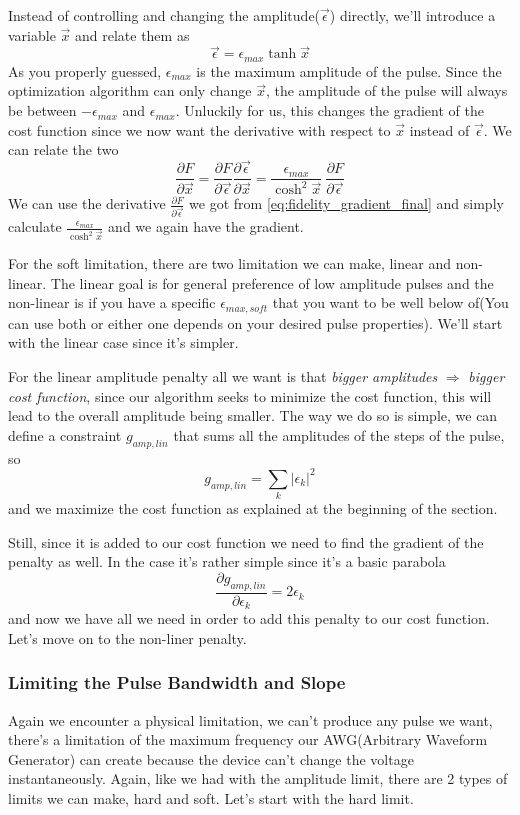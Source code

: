 \documentclass[english, a4paper, 12pt, twoside]{article}
\numberwithin{equation}{section} %
\begin{document}
Instead of controlling and changing the amplitude($\vec{\epsilon}$) directly, we'll introduce a variable $\vec{x}$ and relate them as
$$\vec{\epsilon} = \epsilon_{max}\tanh{\vec{x}}$$
As you properly guessed, $\epsilon_{max}$ is the maximum amplitude of the pulse.
Since the optimization algorithm can only change $\vec{x}$, the amplitude of the pulse will always be between $-\epsilon_{max}$ and $\epsilon_{max}$. Unluckily for us, this changes the gradient of the cost function since we now want the derivative with respect to $\vec{x}$ instead of $\vec{\epsilon}$. We can relate the two
\[
\frac{\partial F}{\partial \vec{x}} = \frac{\partial F}{\partial \vec{\epsilon}}\frac{\partial \vec{\epsilon}}{\partial \vec{x}} = \frac{\epsilon_{max}}{\cosh^2{\vec{x}}} \ \frac{\partial F}{\partial \vec{\epsilon}}
\]
We can use the derivative $\frac{\partial F}{\partial \vec{\epsilon}}$ we got from \ref{eq:fidelity_gradient_final} and simply calculate $\frac{\epsilon_{max}}{\cosh^2{\vec{x}}}$ and we again have the gradient.

For the soft limitation, there are two limitation we can make, linear and non-linear. The linear goal is for general preference of low amplitude pulses and the non-linear is if you have a specific \(\epsilon_{max,soft}\) that you want to be well below of(You can use both or either one depends on your desired pulse properties). We'll start with the linear case since it's simpler.

For the linear amplitude penalty all we want is that \textit{bigger amplitudes} \(\Rightarrow\) \textit{bigger cost function}, since our algorithm seeks to minimize the cost function, this will lead to the overall amplitude being smaller. The way we do so is simple, we can define a constraint \(g_{amp,lin}\) that sums all the amplitudes of the steps of the pulse, so
\[
    g_{amp,lin} = \sum_k |\epsilon_k|^2
\]
and we maximize the cost function as explained at the beginning of the section.

Still, since it is added to our cost function we need to find the gradient of the penalty as well. In the case it's rather simple since it's a basic parabola
\[
    \frac{\partial g_{amp,lin}}{\partial \epsilon_k} = 2\epsilon_k
\]
and now we have all we need in order to add this penalty to our cost function. Let's move on to the non-liner penalty.



\subsubsection{Limiting the Pulse Bandwidth and Slope}
Again we encounter a physical limitation, we can't produce any pulse we want, there's a limitation of the maximum frequency our AWG(Arbitrary Waveform Generator) can create because the device can't change the voltage instantaneously. Again, like we had with the amplitude limit, there are 2 types of limits we can make, hard and soft. Let's start with the hard limit.
\end{document}
